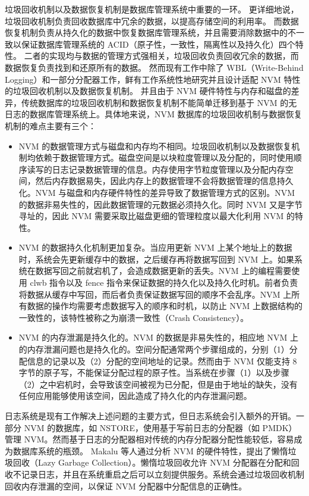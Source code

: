 垃圾回收机制以及数据恢复机制是数据库管理系统中重要的一环。
更详细地说，垃圾回收机制负责回收数据库中冗余的数据，以提高存储空间的利用率。
而数据恢复机制负责从持久化的数据中恢复数据库管理系统，并且需要消除数据中的不一致以保证数据库管理系统的 ACID（原子性，一致性，隔离性以及持久化）四个特性。
二者的实现均与数据的管理方式强相关，垃圾回收负责回收冗余的数据，而数据恢复负责找到和还原所有的数据。
然而现有工作中除了 WBL（Write-Behind Logging）和一部分分配器工作，鲜有工作系统性地研究并且设计适配 NVM 特性的垃圾回收机制以及数据恢复机制。
并且由于 NVM 硬件特性与内存和磁盘的差异，传统数据库的垃圾回收机制和数据恢复机制不能简单迁移到基于 NVM 的无日志的数据库管理系统上。具体地来说，NVM 数据库的垃圾回收机制与数据恢复机制的难点主要有三个：
\begin{itemize}
    \item NVM 的数据管理方式与磁盘和内存均不相同。垃圾回收机制以及数据恢复机制均依赖于数据管理方式。磁盘空间是以块粒度管理以及分配的，同时使用顺序读写的日志记录数据管理的信息。内存使用字节粒度管理以及分配内存空间，然后内存数据易失，因此内存上的数据管理不会将数据管理的信息持久化。NVM 与磁盘和内存硬件特性的差异导致了数据管理方式的区别。NVM 的数据非易失性的，因此数据管理的元数据必须持久化。同时 NVM 又是字节寻址的，因此 NVM 需要采取比磁盘更细的管理粒度以最大化利用 NVM 的特性。
    \item NVM 的数据持久化机制更加复杂。当应用更新 NVM 上某个地址上的数据时，系统会先更新缓存中的数据，之后缓存再将数据写回到 NVM 上。如果系统在数据写回之前就宕机了，会造成数据更新的丢失。NVM 上的编程需要使用 clwb 指令以及 fence 指令来保证数据的持久化以及持久化时机。前者负责将数据从缓存中写回，而后者负责保证数据写回的顺序不会乱序。NVM 上所有数据的操作均需要考虑数据写入的顺序和时机，以防止 NVM 上数据结构的一致性的，该特性被称之为崩溃一致性（Crash Consistency）。
    \item NVM 的内存泄漏是持久化的。NVM 的数据是非易失性的，相应地 NVM 上的内存泄漏问题也是持久化的。空间分配通常两个步骤组成的，分别（1）分配信息的记录以及（2）分配的空间地址的记录。然而由于 NVM 仅能支持 8 字节的原子写，不能保证分配过程的原子性。当系统在步骤（1）以及步骤（2）之中宕机时，会导致该空间被视为已分配，但是由于地址的缺失，没有任何应用能够使用该空间，因此造成了持久化的内存泄漏问题。

\end{itemize}

日志系统是现有工作解决上述问题的主要方式，但日志系统会引入额外的开销。一部分 NVM 的数据库，如 NSTORE，使用基于写前日志的分配器（如 PMDK\cite{pmdk}）管理 NVM。然而基于日志的分配器相对传统的内存分配器分配性能较低，容易成为数据库系统的瓶颈。
Makalu 等人通过分析 NVM 的硬件特性，提出了懒惰垃圾回收（Lazy Garbage Collection）\cite{bhandari_makalu_2016}。懒惰垃圾回收允许 NVM 分配器在分配和回收不记录日志，并且在系统重启之后可以立刻提供服务。系统会通过垃圾回收机制回收内存泄漏的空间，以保证 NVM 分配器中分配信息的正确性。

